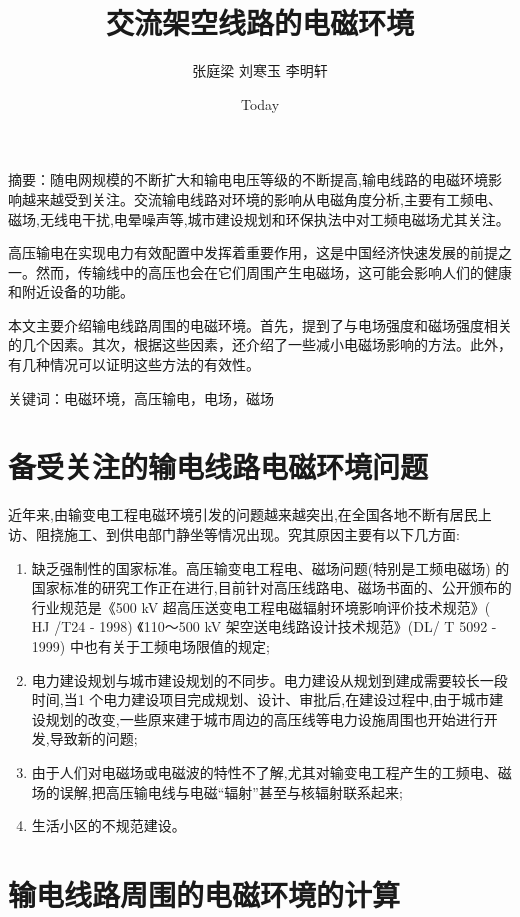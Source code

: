 \documentclass{ctexart} %
\title{交流架空线路的电磁环境}
\author{张庭梁  刘寒玉  李明轩}
\date{Today} %
\begin{document}
\maketitle
摘要：随电网规模的不断扩大和输电电压等级的不断提高,输电线路的电磁环境影响越来越受到关注。交流输电线路对环境的影响从电磁角度分析,主要有工频电、磁场,无线电干扰,电晕噪声等,城市建设规划和环保执法中对工频电磁场尤其关注。

高压输电在实现电力有效配置中发挥着重要作用，这是中国经济快速发展的前提之一。然而，传输线中的高压也会在它们周围产生电磁场，这可能会影响人们的健康和附近设备的功能。

本文主要介绍输电线路周围的电磁环境。首先，提到了与电场强度和磁场强度相关的几个因素。其次，根据这些因素，还介绍了一些减小电磁场影响的方法。此外，有几种情况可以证明这些方法的有效性。

关键词：电磁环境，高压输电，电场，磁场


\section{备受关注的输电线路电磁环境问题}

近年来,由输变电工程电磁环境引发的问题越来越突出,在全国各地不断有居民上访、阻挠施工、到供电部门静坐等情况出现。究其原因主要有以下几方面: 

\begin{enumerate}
\item 
缺乏强制性的国家标准。高压输变电工程电、磁场问题(特别是工频电磁场) 的国家标准的研究工作正在进行,目前针对高压线路电、磁场书面的、公开颁布的行业规范是《500 kV 超高压送变电工程电磁辐射环境影响评价技术规范》( HJ /T24 - 1998) 《110～500 kV 架空送电线路设计技术规范》(DL/ T 5092 - 1999) 中也有关于工频电场限值的规定;
\item 
电力建设规划与城市建设规划的不同步。电力建设从规划到建成需要较长一段时间,当1 个电力建设项目完成规划、设计、审批后,在建设过程中,由于城市建设规划的改变,一些原来建于城市周边的高压线等电力设施周围也开始进行开发,导致新的问题; 
\item
 由于人们对电磁场或电磁波的特性不了解,尤其对输变电工程产生的工频电、磁场的误解,把高压输电线与电磁“辐射”甚至与核辐射联系起来;
\item
生活小区的不规范建设。
\end{enumerate}

\section{输电线路周围的电磁环境的计算}
\end{document}
